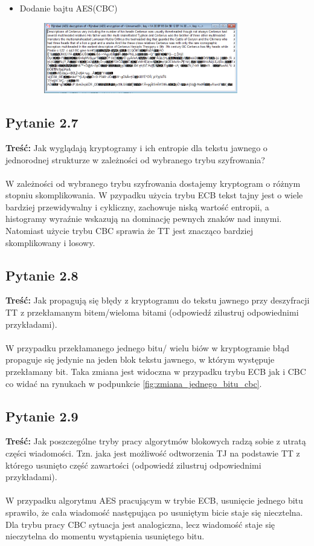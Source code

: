 \documentclass{article}
\begin{document}
\begin{itemize}
\begin{figure}[H]
    \end{figure}
    \item Dodanie bajtu AES(CBC)
    \begin{figure}[H]
        \centering
        \includegraphics[width=0.8\textwidth]{dodanie_cbc.png}
    \end{figure}
\end{itemize}

\subsection{Pytanie 2.7}
    \textbf{Treść:} Jak wyglądają kryptogramy i ich entropie dla tekstu jawnego o jednorodnej strukturze
    w zależności od wybranego trybu szyfrowania? \\\\
    W zależności od wybranego trybu szyfrowania dostajemy kryptogram o różnym stopniu skomplikowania. W pzypadku użycia trybu ECB tekst tajny jest o wiele bardziej przewidywalny i cykliczny, zachowuje niską wartość entropii,
    a histogramy wyraźnie wskazują na dominację pewnych znaków nad innymi. Natomiast użycie trybu CBC sprawia że TT jest znacząco bardziej skomplikowany i losowy.
\subsection{Pytanie 2.8}
    \textbf{Treść:} Jak propagują się błędy z kryptogramu do tekstu jawnego przy deszyfracji TT z przekłamanym
    bitem/wieloma bitami (odpowiedź zilustruj odpowiednimi przykładami).\\\\
    W przypadku przekłamanego jednego bitu/ wielu biów w kryptogramie błąd propaguje się jedynie na jeden blok tekstu jawnego, w którym występuje przekłamany bit. Taka zmiana jest widoczna w przypadku trybu ECB jak i CBC co widać na
    rynukach w podpunkcie \ref{fig:zmiana_jednego_bitu_cbc}.
\subsection{Pytanie 2.9}
    \textbf{Treść:} Jak poszczególne tryby pracy algorytmów blokowych radzą sobie z utratą części wiadomości. Tzn.
    jaka jest możliwość odtworzenia TJ na podstawie TT z którego usunięto część zawartości (odpowiedź zilustruj odpowiednimi przykładami).\\\\
    W przypadku algorytmu AES pracującym w trybie ECB, usunięcie jednego bitu sprawiło, że cała wiadomość następująca po usuniętym bicie staje się niecztelna. 
    Dla trybu pracy CBC sytuacja jest analogiczna, lecz wiadomość staje się nieczytelna do momentu wystąpienia usuniętego bitu.
\end{document}
